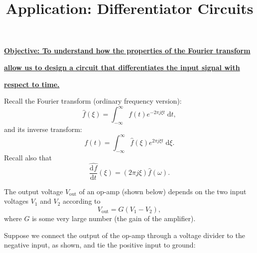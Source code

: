 \documentclass{article}
\newcommand{\deriv}[3][]{\frac{\mathrm{d}^{#1}#2}{\mathrm{d}#3^{#1}}}
\newcommand{\diff}{\;\mathrm{d}}
\begin{document}
\title{Application: Differentiator Circuits}
\date{}

\maketitle
\thispagestyle{empty}

\Large

\vskip -10mm

\textbf{\underline{Objective: To understand how the properties of the Fourier transform }}

\textbf{\underline{allow us to design a circuit that differentiates the input signal with}}

\textbf{\underline{respect to time.}}






\vspace{5mm}








Recall the Fourier transform (ordinary frequency version):
\[\hat{f}(\xi) = \int_{-\infty}^\infty f(t)e^{-2\pi j \xi t}\diff t,\]
and its inverse transform:
\[f(t)=\int_{-\infty}^\infty \hat{f}(\xi)e^{2\pi j\xi t}\diff \xi.\]
Recall also that
\[\widehat{\deriv{f}{t}}(\xi)=(2\pi j \xi)\hat{f}(\omega).\]\bigskip








The output voltage $V_\mathrm{out}$ of an op-amp (shown below) depends on the two input voltages $V_1$ and $V_2$ according to
\[V_\mathrm{out}=G(V_1-V_2),\]
where $G$ is some very large number (the gain of the amplifier).

\begin{center}
\end{center}

\clearpage


Suppose we connect the output of the op-amp through a voltage divider to the negative input, as shown, and tie the positive input to ground:
\end{document}
